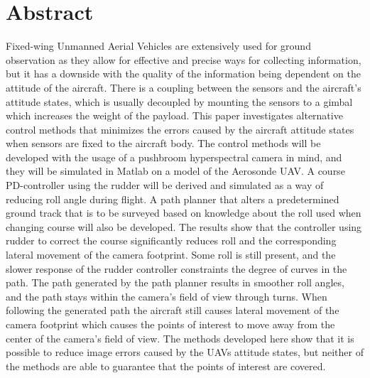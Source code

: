 \section*{Abstract}

Fixed-wing Unmanned Aerial Vehicles are extensively used for ground observation as they allow for effective and precise ways for collecting information, but it has a downside with the quality of the information being dependent on the attitude of the aircraft. There is a coupling between the sensors and the aircraft's attitude states, which is usually decoupled by mounting the sensors to a gimbal which increases the weight of the payload. This paper investigates alternative control methods that minimizes the errors caused by the aircraft attitude states when sensors are fixed to the aircraft body. The control methods will be developed with the usage of a pushbroom hyperspectral camera in mind, and they will be simulated in Matlab on a model of the Aerosonde UAV. A course PD-controller using the rudder will be derived and simulated as a way of reducing roll angle during flight. A path planner that alters a predetermined ground track that is to be surveyed based on knowledge about the roll used when changing course will also be developed. The results show that the controller using rudder to correct the course significantly reduces roll and the corresponding lateral movement of the camera footprint. Some roll is still present, and the slower response of the rudder controller constraints the degree of curves in the path. The path generated by the path planner results in smoother roll angles, and the path stays within the camera's field of view through turns. When following the generated path the aircraft still causes lateral movement of the camera footprint which causes the points of interest to move away from the center of the camera's field of view. The methods developed here show that it is possible to reduce image errors caused by the UAVs attitude states, but neither of the methods are able to guarantee that the points of interest are covered.